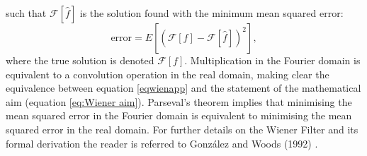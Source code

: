 such that $\mathscr{F}[\widehat{f}]$ is the solution found with the minimum mean squared error:
\begin{equation}
\text{error} = E\left[ \left(\mathscr{F}[f]-\mathscr{F}[\widehat{f}]\right)^2\right],
\label{eqerr}
\end{equation}
where the true solution is denoted $\mathscr{F}[f]$.
Multiplication in the Fourier domain is equivalent to a convolution operation in the real domain, making clear the equivalence between equation \ref{eqwienapp} and the statement of the mathematical aim (equation \ref{eq:Wiener aim}).
Parseval's theorem implies that minimising the mean squared error in the Fourier domain is equivalent to minimising the mean squared error in the real domain. For further details on the Wiener Filter and its formal derivation the reader is referred to Gonz\'{a}lez and Woods (1992) \nocite{gon1992}.

